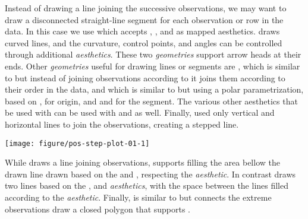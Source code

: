 \documentclass[krantz2]{krantz}\usepackage{knitr}%
\begin{document}
Instead of drawing a line joining the successive observations, we may want to draw a disconnected straight-line segment for each observation or row in the data. In this case we use  which accepts , ,  and  as mapped aesthetics.  draws curved lines, and the curvature, control points, and angles can be controlled through additional \emph{aesthetics}. These two \emph{geometries} support arrow heads at their ends. Other \emph{geometries} useful for drawing lines or segments are , which is similar to  but instead of joining observations according to  it joins them according to their order in the data, and  which is similar to  but using a polar parametrization, based on ,  for origin, and  and  for the segment. The various other aesthetics that be used with  can be used with  and  as well. Finally,  used only vertical and horizontal lines to join the observations, creating a stepped line.

\begin{knitrout}\footnotesize
{}\color{fgcolor}\begin{kframe}
\begin{alltt}
\hlstd{(} 
       \hlstd{(}      \hlopt{+}
  \hlstd{()}
\end{alltt}
\end{kframe}

{\centering \texttt{[image: figure/pos-step-plot-01-1]} 

}



\end{knitrout}

While  draws a line joining observations,  supports filling the area bellow the drawn line drawn based on the  and , respecting the  \emph{aesthetic}. In contrast  draws two lines based on the ,  and  \emph{aesthetics}, with the space between the lines filled according to the  \emph{aesthetic}. Finally,  is similar to  but connects the extreme observations draw a closed polygon that supports .
\end{document}
